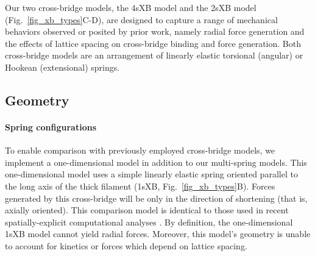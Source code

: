 \documentclass[]{article}
\begin{document}
Our two cross-bridge models, the 4sXB model and the 2sXB model (Fig.~\ref{fig_xb_types}C-D), are designed to capture a range of mechanical behaviors observed or posited by prior work, namely radial force generation and the effects of lattice spacing on cross-bridge binding and force generation.  
Both cross-bridge models are an arrangement of linearly elastic torsional (angular) or Hookean (extensional) springs.  

\subsection*{Geometry} %

\paragraph{Spring configurations} %
To enable comparison with previously employed cross-bridge models, we implement a one-dimensional model in addition to our multi-spring models. 
This one-dimensional model uses a simple linearly elastic spring oriented parallel to the long axis of the thick filament (1sXB, Fig.~\ref{fig_xb_types}B).  
Forces generated by this cross-bridge will be only in the direction of shortening (that is, axially oriented). 
This comparison model is identical to those used in recent spatially-explicit computational analyses \citep{Daniel1998, Chase2004, Tanner2007}. 
By definition, the one-dimensional 1sXB model cannot yield radial forces.  
Moreover, this model's geometry is unable to account for kinetics or forces which depend on lattice spacing. 
\end{document}
